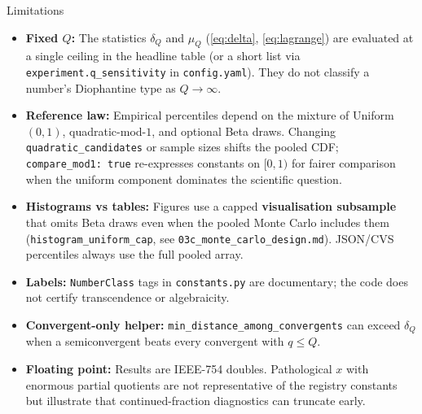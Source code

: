 \documentclass[
  ignorenonframetext,
]{beamer}
\author{\texorpdfstring{}{}}
\date{}
\begin{document}
\begin{frame}[fragile]{Limitations}
\protect{}\label{limitations}
\begin{itemize}
\item
  \textbf{Fixed \(Q\):} The statistics \(\delta_Q\) and \(\mu_Q\)
  (\eqref{eq:delta}, \eqref{eq:lagrange}) are evaluated at a single
  ceiling in the headline table (or a short list via
  \texttt{experiment.q\_sensitivity} in \texttt{config.yaml}). They do
  not classify a number's Diophantine type as \(Q \to \infty\).
\item
  \textbf{Reference law:} Empirical percentiles depend on the mixture of
  Uniform\((0,1)\), quadratic-mod-\(1\), and optional Beta draws.
  Changing \texttt{quadratic\_candidates} or sample sizes shifts the
  pooled CDF; \texttt{compare\_mod1:\ true} re-expresses constants on
  \([0,1)\) for fairer comparison when the uniform component dominates
  the scientific question.
\item
  \textbf{Histograms vs tables:} Figures use a capped
  \textbf{visualisation subsample} that omits Beta draws even when the
  pooled Monte Carlo includes them (\texttt{histogram\_uniform\_cap},
  see \texttt{03c\_monte\_carlo\_design.md}). JSON/CVS percentiles
  always use the full pooled array.
\item
  \textbf{Labels:} \texttt{NumberClass} tags in \texttt{constants.py}
  are documentary; the code does not certify transcendence or
  algebraicity.
\item
  \textbf{Convergent-only helper:}
  \texttt{min\_distance\_among\_convergents} can exceed \(\delta_Q\)
  when a semiconvergent beats every convergent with \(q \leq Q\).
\item
  \textbf{Floating point:} Results are IEEE-754 doubles. Pathological
  \(x\) with enormous partial quotients are not representative of the
  registry constants but illustrate that continued-fraction diagnostics
  can truncate early.
\end{itemize}
\end{frame}
\end{document}
